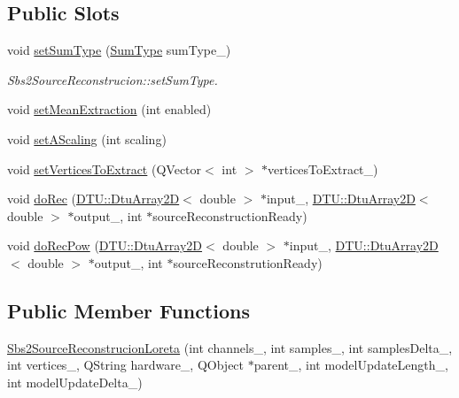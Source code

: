 \subsection*{Public Slots}
\begin{DoxyCompactItemize}
\item 
void \hyperlink{classSbs2SourceReconstrucionLoreta_a1d8f39e7aaceeffede70e9c16fe2847b}{set\-Sum\-Type} (\hyperlink{classSbs2SourceReconstrucionLoreta_aebf0de7b32b377d64f23f1bf71c119f7}{Sum\-Type} sum\-Type\-\_\-)
\begin{DoxyCompactList}\small\item\em Sbs2\-Source\-Reconstrucion\-::set\-Sum\-Type. \end{DoxyCompactList}\item 
void \hyperlink{classSbs2SourceReconstrucionLoreta_a12b14c29ebe6c3a2a04f216206a572d7}{set\-Mean\-Extraction} (int enabled)
\item 
void \hyperlink{classSbs2SourceReconstrucionLoreta_a8b46d92b0bdb35d38224c06ab3ab9f70}{set\-A\-Scaling} (int scaling)
\item 
void \hyperlink{classSbs2SourceReconstrucionLoreta_a1dcd35bbd82f8157c00778e9f2e51610}{set\-Vertices\-To\-Extract} (Q\-Vector$<$ int $>$ $\ast$vertices\-To\-Extract\-\_\-)
\item 
void \hyperlink{classSbs2SourceReconstrucionLoreta_ae65de60277bf2934800b2eacacc37a68}{do\-Rec} (\hyperlink{classDTU_1_1DtuArray2D}{D\-T\-U\-::\-Dtu\-Array2\-D}$<$ double $>$ $\ast$input\-\_\-, \hyperlink{classDTU_1_1DtuArray2D}{D\-T\-U\-::\-Dtu\-Array2\-D}$<$ double $>$ $\ast$output\-\_\-, int $\ast$source\-Reconstruction\-Ready)
\item 
void \hyperlink{classSbs2SourceReconstrucionLoreta_a16f7bb0a19cccb1e8520d315135506db}{do\-Rec\-Pow} (\hyperlink{classDTU_1_1DtuArray2D}{D\-T\-U\-::\-Dtu\-Array2\-D}$<$ double $>$ $\ast$input\-\_\-, \hyperlink{classDTU_1_1DtuArray2D}{D\-T\-U\-::\-Dtu\-Array2\-D}$<$ double $>$ $\ast$output\-\_\-, int $\ast$source\-Reconstrution\-Ready)
\end{DoxyCompactItemize}
\subsection*{Public Member Functions}
\begin{DoxyCompactItemize}
\item 
\hyperlink{classSbs2SourceReconstrucionLoreta_ac7dfbacf96035d958a698dfd23108ba9}{Sbs2\-Source\-Reconstrucion\-Loreta} (int channels\-\_\-, int samples\-\_\-, int samples\-Delta\-\_\-, int vertices\-\_\-, Q\-String hardware\-\_\-, Q\-Object $\ast$parent\-\_\-, int model\-Update\-Length\-\_, int model\-Update\-Delta\-\_)
\end{DoxyCompactItemize}
